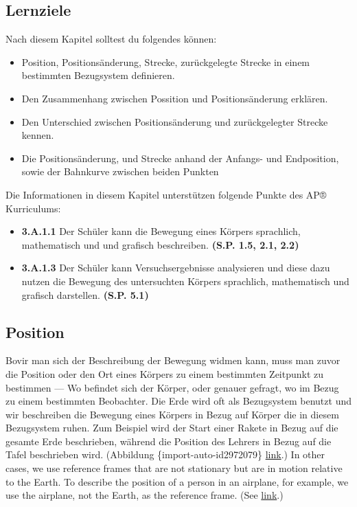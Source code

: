 \documentclass[
]{book}
\providecommand{\tightlist}{%
  \setlength{\itemsep}{0pt}\setlength{\parskip}{0pt}}
\newenvironment{learning-objectives}{}{}
\begin{document}
\hypertarget{fs-id3277370}{}
\begin{learning-objectives}

\hypertarget{lernziele}{%
\subsection{Lernziele}\label{lernziele}}

Nach diesem Kapitel solltest du folgendes können:

\begin{itemize}
\tightlist
\item
  Position, Positionsänderung, Strecke, zurückgelegte Strecke in einem bestimmten Bezugsystem definieren.
\item
  Den Zusammenhang zwischen Possition und Positionsänderung erklären.
\item
  Den Unterschied zwischen Positionsänderung und zurückgelegter Strecke kennen.
\item
  Die Positionsänderung, und Strecke anhand der Anfangs- und Endposition, sowie der Bahnkurve zwischen beiden Punkten
\end{itemize}

Die Informationen in diesem Kapitel unterstützen folgende Punkte des AP® Kurriculums:

\begin{itemize}
\tightlist
\item
  \textbf{3.A.1.1} Der Schüler kann die Bewegung eines Körpers sprachlich, mathematisch und und grafisch beschreiben.
  \textbf{(S.P. 1.5, 2.1, 2.2)}
\item
  \textbf{3.A.1.3} Der Schüler kann Versuchsergebnisse analysieren und diese dazu nutzen die Bewegung des untersuchten Körpers sprachlich, mathematisch und grafisch darstellen. \textbf{(S.P. 5.1)}
\end{itemize}

\end{learning-objectives}

\hypertarget{fs-id3178358}{}
\hypertarget{position}{%
\subsection{Position}\label{position}}

Bovir man sich der Beschreibung der Bewegung widmen kann, muss man zuvor die {Position} oder den Ort eines Körpers zu einem bestimmten Zeitpunkt zu bestimmen --- Wo befindet sich der Körper, oder genauer gefragt, wo im Bezug zu einem bestimmten Beobachter. Die Erde wird oft als Bezugsystem benutzt und wir beschreiben die Bewegung eines Körpers in Bezug auf Körper die in diesem Bezugsystem ruhen. Zum Beispiel wird der Start einer Rakete in Bezug auf die gesamte Erde beschrieben, während die Position des Lehrers in Bezug auf die Tafel beschrieben wird. (Abbildung
\citet{ref}\{import-auto-id2972079\} \protect\hyperlink{import-auto-id2972079}{link}.) In other cases,
we use reference frames that are not stationary but are in motion
relative to the Earth. To describe the position of a person in an
airplane, for example, we use the airplane, not the Earth, as the
reference frame. (See
\protect\hyperlink{import-auto-id2707699}{link}.)
\end{document}
